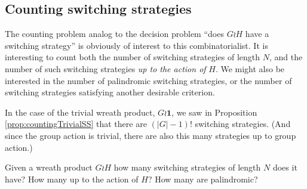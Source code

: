 \subsection{Counting switching strategies}
The counting problem analog to the decision problem
``does $G \wr H$ have a switching strategy'' is obviously of interest to this
combinatorialist. It is interesting to count both the number of switching
strategies of length $N$, and the number of such switching strategies
\textit{up to the action of} $H$. We might also be interested in the number of
palindromic switching strategies, or the number of switching strategies
satisfying another desirable criterion.

In the case of the trivial wreath product, $G \wr \mathbf{1}$, we saw in
Proposition \ref{prop:countingTrivialSS} that there are ${(|G| - 1)!}$
switching strategies. (And since the group action is trivial, there are also
this many strategies up to group action.)

\begin{openquestion}
  Given a wreath product $G \wr H$ how many switching strategies of length $N$
  does it have? How many up to the action of $H$? How many are palindromic?
\end{openquestion}


